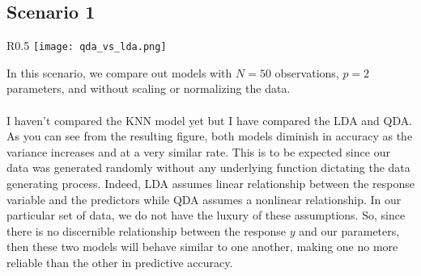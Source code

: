 \documentclass[11pt, oneside]{article}
\begin{document}

\subsection*{Scenario 1}

\begin{wrapfigure}[]{R}{0.5\textwidth}
\vspace{-0.55cm}
\texttt{[image: qda\_vs\_lda.png]}
\vspace{-.55cm}
\end{wrapfigure}
In this scenario, we compare out models with $N=50$ observations, $p=2$ parameters, and without scaling or normalizing the data.\\
\\
I haven't compared the KNN model yet but I have compared the LDA and QDA. As you can see from the resulting figure, both models diminish in accuracy as the variance increases and at a very similar rate. This is to be expected since our data was generated randomly without any underlying function dictating the data generating process. Indeed, LDA assumes linear relationship between the response variable and the predictors while QDA assumes a nonlinear relationship. In our particular set of data, we do not have the luxury of these assumptions. So, since there is no discernible relationship between the response $y$ and our parameters, then these two models will behave similar to one another, making one no more reliable than the other in predictive accuracy. \\
\\ 
\end{document}
